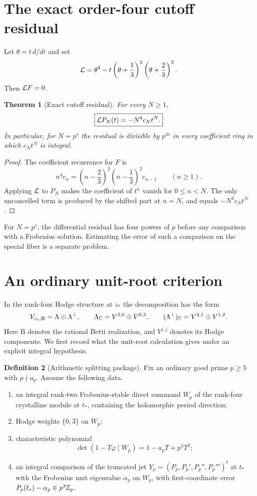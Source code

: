 \documentclass[11pt,letterpaper]{article}
\newtheorem{theorem}{Theorem}[section]
\theoremstyle{definition}
\newtheorem{definition}[theorem]{Definition}
\theoremstyle{remark}
\begin{document}
\section{The exact order-four cutoff residual}

Let $\theta=t\,d/dt$ and set
\[
 \mathcal L=\theta^4-t\left(\theta+\frac13\right)^2
                  \left(\theta+\frac23\right)^2.
\]
Then $\mathcal L F=0$.

\begin{theorem}[Exact cutoff residual]\label{III:thm:residual}
For every $N\ge1$,
\[
 \boxed{\mathcal L P_N(t)=-N^4c_Nt^N.}
\]
In particular, for $N=p^s$ the residual is divisible by $p^{4s}$ in every coefficient ring in which
$c_Nt^N$ is integral.
\end{theorem}

\begin{proof}
The coefficient recurrence for $F$ is
\[
 n^4c_n=\left(n-\frac23\right)^2
        \left(n-\frac13\right)^2c_{n-1}\qquad(n\ge1).
\]
Applying $\mathcal L$ to $P_N$ makes the coefficient of $t^n$ vanish for $0\le n<N$.
The only uncancelled term is produced by the shifted part at $n=N$, and equals
$-N^4c_Nt^N$.
\end{proof}


For $N=p^s$, the differential residual has four powers of $p$ before
any comparison with a Frobenius solution. Estimating the error of
such a comparison on the special fiber is a separate problem.

\section{An ordinary unit-root criterion}

In the rank-four Hodge structure at $z_*$ the decomposition has the
form
\[
 V_{z_*,\mathrm B}=\Lambda\oplus\Lambda^\perp,\qquad
 \Lambda_\mathbb C=V^{3,0}\oplus V^{0,3},\qquad
 (\Lambda^\perp)_\mathbb C=V^{2,1}\oplus V^{1,2}.
\]
Here $\mathrm B$ denotes the rational Betti realization, and
$V^{i,j}$ denotes its Hodge components. We first record what the
unit-root calculation gives under an explicit integral hypothesis.

\begin{definition}[Arithmetic splitting package]\label{III:def:package}
Fix an ordinary good prime $p\ge5$ with $p\nmid a_p$. Assume the following data.
\begin{enumerate}[label=(A\arabic*)]
\item an integral rank-two Frobenius-stable direct summand $W_p$ of the rank-four crystalline module at
$t_*$, containing the holomorphic period direction;
\item Hodge weights $\{0,3\}$ on $W_p$;
\item characteristic polynomial
\[
 \det(1-T\varphi\mid W_p)=1-a_pT+p^3T^2;
\]

\item an integral comparison of the truncated jet
$Y_p=(P_p,P_p',P_p'',P_p''')^{\mathsf t}$ at $t_*$
with the Frobenius unit eigenvalue $\alpha_p$ on $W_p$,
with first-coordinate error $P_p(t_*)-\alpha_p\in p^3\mathbb Z_p$.

\end{enumerate}
\end{definition}
\end{document}
